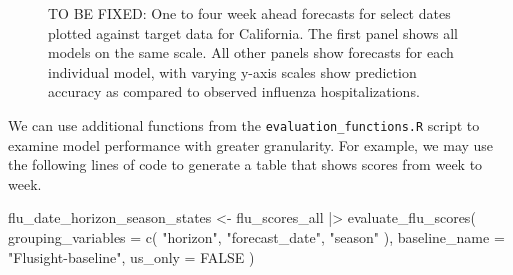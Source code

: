 \documentclass[
]{article}
\newenvironment{Shaded}{\begin{snugshade}}{\end{snugshade}}
\newcommand{\AttributeTok}[1]{\textcolor[rgb]{0.40,0.45,0.13}{#1}}
\newcommand{\ConstantTok}[1]{\textcolor[rgb]{0.56,0.35,0.01}{#1}}
\newcommand{\FunctionTok}[1]{\textcolor[rgb]{0.28,0.35,0.67}{#1}}
\newcommand{\NormalTok}[1]{\textcolor[rgb]{0.00,0.23,0.31}{#1}}
\newcommand{\OtherTok}[1]{\textcolor[rgb]{0.00,0.23,0.31}{#1}}
\newcommand{\SpecialCharTok}[1]{\textcolor[rgb]{0.37,0.37,0.37}{#1}}
\newcommand{\StringTok}[1]{\textcolor[rgb]{0.13,0.47,0.30}{#1}}
\begin{document}
\begin{figure}[H]


\caption{\label{fig-plot-forecasts-hubVis}TO BE FIXED: One to four week
ahead forecasts for select dates plotted against target data for
California. The first panel shows all models on the same scale. All
other panels show forecasts for each individual model, with varying
y-axis scales show prediction accuracy as compared to observed influenza
hospitalizations.}

\end{figure}%

We can use additional functions from the
\texttt{evaluation\_functions.R} script to examine model performance
with greater granularity. For example, we may use the following lines of
code to generate a table that shows scores from week to week.

\begin{Shaded}
\begin{Highlighting}[]
\NormalTok{flu\_date\_horizon\_season\_states }\OtherTok{\textless{}{-}}\NormalTok{ flu\_scores\_all }\SpecialCharTok{|\textgreater{}}
  \FunctionTok{evaluate\_flu\_scores}\NormalTok{(}
    \AttributeTok{grouping\_variables =} \FunctionTok{c}\NormalTok{(}
      \StringTok{"horizon"}\NormalTok{, }\StringTok{"forecast\_date"}\NormalTok{,}
      \StringTok{"season"}
\NormalTok{    ),}
    \AttributeTok{baseline\_name =} \StringTok{"Flusight{-}baseline"}\NormalTok{, }\AttributeTok{us\_only =} \ConstantTok{FALSE}
\NormalTok{  )}
\end{Highlighting}
\end{Shaded}
\end{document}

